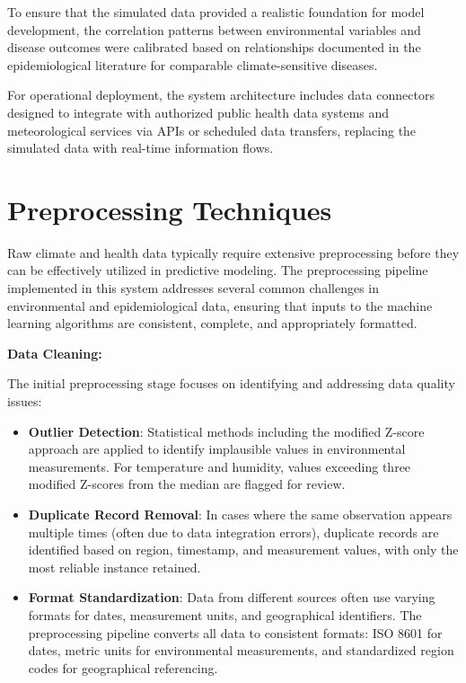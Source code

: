 \documentclass[12pt,a4paper]{report}
\begin{document}
To ensure that the simulated data provided a realistic foundation for model development, the correlation patterns between environmental variables and disease outcomes were calibrated based on relationships documented in the epidemiological literature for comparable climate-sensitive diseases.

For operational deployment, the system architecture includes data connectors designed to integrate with authorized public health data systems and meteorological services via APIs or scheduled data transfers, replacing the simulated data with real-time information flows.

\section{Preprocessing Techniques}
Raw climate and health data typically require extensive preprocessing before they can be effectively utilized in predictive modeling. The preprocessing pipeline implemented in this system addresses several common challenges in environmental and epidemiological data, ensuring that inputs to the machine learning algorithms are consistent, complete, and appropriately formatted.

\textbf{Data Cleaning:}

The initial preprocessing stage focuses on identifying and addressing data quality issues:

\begin{itemize}
    \item \textbf{Outlier Detection}: Statistical methods including the modified Z-score approach are applied to identify implausible values in environmental measurements. For temperature and humidity, values exceeding three modified Z-scores from the median are flagged for review.
    
    \item \textbf{Duplicate Record Removal}: In cases where the same observation appears multiple times (often due to data integration errors), duplicate records are identified based on region, timestamp, and measurement values, with only the most reliable instance retained.
    
    \item \textbf{Format Standardization}: Data from different sources often use varying formats for dates, measurement units, and geographical identifiers. The preprocessing pipeline converts all data to consistent formats: ISO 8601 for dates, metric units for environmental measurements, and standardized region codes for geographical referencing.
\end{itemize}
\end{document}
